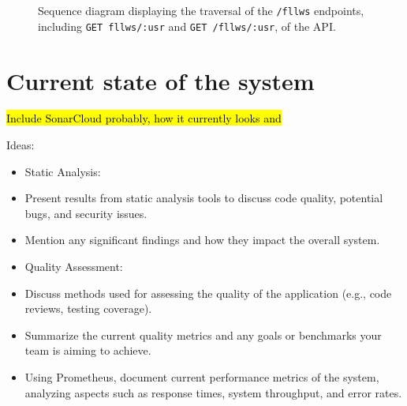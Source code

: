 \documentclass[12pt, a4paper, oneside]{book}
\begin{document}
\begin{figure}[H]
    \centering
    \caption{Sequence diagram displaying the traversal of the \texttt{/fllws} endpoints, including \texttt{GET fllws/:usr} and \texttt{GET /fllws/:usr}, of the API.}
    \label{fig:seq-diagram-follow}
\end{figure}

\section{Current state of the system}
\hl{Include SonarCloud probably, how it currently looks and}


Ideas:
\begin{itemize}
    
\item Static Analysis:
\item Present results from static analysis tools to discuss code quality, potential bugs, and security issues.
\item Mention any significant findings and how they impact the overall system.
\item Quality Assessment:
\item Discuss methods used for assessing the quality of the application (e.g., code reviews, testing coverage).
\item Summarize the current quality metrics and any goals or benchmarks your team is aiming to achieve.
\item Using Prometheus, document current performance metrics of the system, analyzing aspects such as response times, system throughput, and error rates.

\end{itemize}
\end{document}

